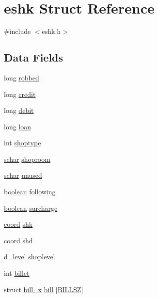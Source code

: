 \hypertarget{structeshk}{\section{eshk Struct Reference}
\label{structeshk}
}


{\ttfamily \#include $<$eshk.\+h$>$}

\subsection*{Data Fields}
\begin{DoxyCompactItemize}
\item 
long \hyperlink{structeshk_abf2d0c23f1ad51c4e8eddb4ee9214b09}{robbed}
\item 
long \hyperlink{structeshk_a673827b266a4208b0c1c4f7155481614}{credit}
\item 
long \hyperlink{structeshk_a2dc7e7788b1c6300dba3ac1a1b0f684f}{debit}
\item 
long \hyperlink{structeshk_a90da51ea1c3c4fa444dd83daea94138b}{loan}
\item 
int \hyperlink{structeshk_aa1c9ca9144c5d5ba321fd5d0a7428456}{shoptype}
\item 
\hyperlink{config_8h_a0fd9ce9d735064461bebfe6037026093}{schar} \hyperlink{structeshk_ad95d79157dfcdfdb073d0dcaa87da43d}{shoproom}
\item 
\hyperlink{config_8h_a0fd9ce9d735064461bebfe6037026093}{schar} \hyperlink{structeshk_a38a72b842c11a39703c2d37d0a83b873}{unused}
\item 
\hyperlink{global_8h_a531b10dd351aa162d7dcccd1966308b8}{boolean} \hyperlink{structeshk_a65a1313473ad52859ffbac243f876b63}{following}
\item 
\hyperlink{global_8h_a531b10dd351aa162d7dcccd1966308b8}{boolean} \hyperlink{structeshk_a563676db07c70fedb8f039b162b9aac5}{surcharge}
\item 
\hyperlink{structcoord}{coord} \hyperlink{structeshk_a93c0f1e37adb65084af66a2accd8403e}{shk}
\item 
\hyperlink{structcoord}{coord} \hyperlink{structeshk_ad7e4387c966a39ba064845f5f0934465}{shd}
\item 
\hyperlink{structd__level}{d\+\_\+level} \hyperlink{structeshk_a18bd83a844e4ff4f23299b789220feba}{shoplevel}
\item 
int \hyperlink{structeshk_a308503dfea18102267b48e75db0c4615}{billct}
\item 
struct \hyperlink{structbill__x}{bill\+\_\+x} \hyperlink{structeshk_ab38dc2696d3a24ab5391b2fcd01df7c1}{bill} \mbox{[}\hyperlink{eshk_8h_aeb4f31dd9538ed8e07420c1be384849b}{B\+I\+L\+L\+S\+Z}\mbox{]}

\end{DoxyCompactItemize}
